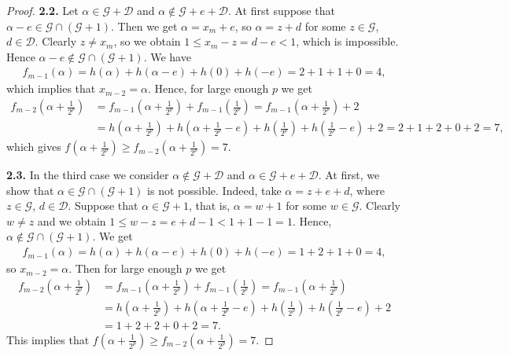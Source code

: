 \documentclass{amsart}
\theoremstyle{definition}
\begin{document}
\begin{proof}
\noindent
{\bf 2.2.} Let $\alpha\in \mathcal{G}+\mathcal{D}$ and $\alpha\notin \mathcal{G}+e+\mathcal{D}$. At first suppose that $\alpha-e\in \mathcal{G}\cap(\mathcal{G}+1)$. Then we get $\alpha=x_m+e$, so $\alpha=z+d$ for some $z\in \mathcal{G}$, $d\in \mathcal{D}$. Clearly $z\neq x_m$, so we obtain $1\leq x_m-z=d-e<1$, which is impossible. Hence $\alpha-e\notin \mathcal{G}\cap(\mathcal{G}+1)$. We have
\begin{align*}
f_{m-1}(\alpha)=h(\alpha)+h(\alpha-e)+h(0)+h(-e)=2+1+1+0=4,
\end{align*}
which implies that $x_{m-2}=\alpha$. Hence, for large enough $p$ we get 
\begin{align*}
f_{m-2}\left(\alpha+\frac{1}{2^p}\right) & =f_{m-1}\left(\alpha+\frac{1}{2^p}\right)+f_{m-1}\left(\frac{1}{2^p}\right)=f_{m-1}\left(\alpha+\frac{1}{2^p}\right)+2 \\
& =h\left(\alpha+\frac{1}{2^p}\right)+h\left(\alpha+\frac{1}{2^p}-e\right)+h\left(\frac{1}{2^p}\right)+h\left(\frac{1}{2^p}-e\right)+2=2+1+2+0+2=7,
\end{align*}
which gives $f\left(\alpha+\frac{1}{2^p}\right)\geq f_{m-2}\left(\alpha+\frac{1}{2^p}\right)=7$.

\vspace{0.15cm}

\noindent
{\bf 2.3.} In the third case we consider $\alpha\notin \mathcal{G}+\mathcal{D}$ and $\alpha\in \mathcal{G}+e+\mathcal{D}$. At first, we show that $\alpha\in \mathcal{G}\cap(\mathcal{G}+1)$ is not possible. Indeed, take $\alpha=z+e+d$, where $z\in \mathcal{G}$, $d\in \mathcal{D}$. Suppose that $\alpha\in \mathcal{G}+1$, that is, $\alpha=w+1$ for some $w\in \mathcal{G}$. Clearly $w\neq z$ and we obtain $1\leq w-z=e+d-1<1+1-1=1$. Hence, $\alpha\notin \mathcal{G}\cap(\mathcal{G}+1)$. We get 
\begin{align*}
f_{m-1}(\alpha)=h(\alpha)+h(\alpha-e)+h(0)+h(-e)=1+2+1+0=4,
\end{align*}
so $x_{m-2}=\alpha$. Then for large enough $p$ we get 
\begin{align*}
f_{m-2}\left(\alpha+\frac{1}{2^p}\right) & =f_{m-1}\left(\alpha+\frac{1}{2^p}\right)+f_{m-1}\left(\frac{1}{2^p}\right)=f_{m-1}\left(\alpha+\frac{1}{2^p}\right) \\
& =h\left(\alpha+\frac{1}{2^p}\right)+h\left(\alpha+\frac{1}{2^p}-e\right)+h\left(\frac{1}{2^p}\right)+h\left(\frac{1}{2^p}-e\right)+2 \\
& =1+2+2+0+2=7.
\end{align*}
This implies that $f(\alpha+\frac{1}{2^p})\geq f_{m-2}(\alpha+\frac{1}{2^p})=7$.


\end{proof}
\end{document}
